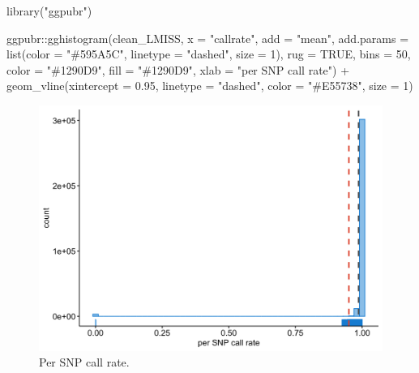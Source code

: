 \documentclass[
]{book}
\newenvironment{Shaded}{\begin{snugshade}}{\end{snugshade}}
\newcommand{\AttributeTok}[1]{\textcolor[rgb]{0.77,0.63,0.00}{#1}}
\newcommand{\ConstantTok}[1]{\textcolor[rgb]{0.00,0.00,0.00}{#1}}
\newcommand{\DecValTok}[1]{\textcolor[rgb]{0.00,0.00,0.81}{#1}}
\newcommand{\FloatTok}[1]{\textcolor[rgb]{0.00,0.00,0.81}{#1}}
\newcommand{\FunctionTok}[1]{\textcolor[rgb]{0.00,0.00,0.00}{#1}}
\newcommand{\NormalTok}[1]{#1}
\newcommand{\SpecialCharTok}[1]{\textcolor[rgb]{0.00,0.00,0.00}{#1}}
\newcommand{\StringTok}[1]{\textcolor[rgb]{0.31,0.60,0.02}{#1}}
\begin{document}
\begin{Shaded}
\begin{Highlighting}[]
\FunctionTok{library}\NormalTok{(}\StringTok{"ggpubr"}\NormalTok{)}

\NormalTok{ggpubr}\SpecialCharTok{::}\FunctionTok{gghistogram}\NormalTok{(clean\_LMISS, }\AttributeTok{x =} \StringTok{"callrate"}\NormalTok{,}
                    \AttributeTok{add =} \StringTok{"mean"}\NormalTok{, }\AttributeTok{add.params =} \FunctionTok{list}\NormalTok{(}\AttributeTok{color =} \StringTok{"\#595A5C"}\NormalTok{, }\AttributeTok{linetype =} \StringTok{"dashed"}\NormalTok{, }\AttributeTok{size =} \DecValTok{1}\NormalTok{),}
                    \AttributeTok{rug =} \ConstantTok{TRUE}\NormalTok{, }\AttributeTok{bins =} \DecValTok{50}\NormalTok{,}
                    \AttributeTok{color =} \StringTok{"\#1290D9"}\NormalTok{, }\AttributeTok{fill =} \StringTok{"\#1290D9"}\NormalTok{,}
                    \AttributeTok{xlab =} \StringTok{"per SNP call rate"}\NormalTok{) }\SpecialCharTok{+}
  \FunctionTok{geom\_vline}\NormalTok{(}\AttributeTok{xintercept =} \FloatTok{0.95}\NormalTok{, }\AttributeTok{linetype =} \StringTok{"dashed"}\NormalTok{,}
                \AttributeTok{color =} \StringTok{"\#E55738"}\NormalTok{, }\AttributeTok{size =} \DecValTok{1}\NormalTok{)}
\end{Highlighting}
\end{Shaded}

\begin{figure}

{\centering \includegraphics[width=18.67in]{img/_gwas/show-snp-callrate} 

}

\caption{Per SNP call rate.}\label{fig:show-snp-callrate}
\end{figure}
\end{document}

